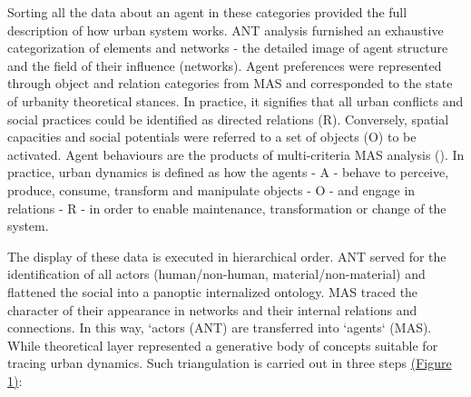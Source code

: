 \documentclass[11pt]{report}
\begin{document}
Sorting all the data about an agent in these categories provided the full description of how urban system works. ANT analysis furnished an exhaustive categorization of elements and networks - the detailed image of agent structure and the field of their influence (networks). Agent preferences were represented through object and relation categories from MAS and corresponded to the state of urbanity theoretical stances. In practice, it signifies that all urban conflicts and social practices could be identified as directed relations (R). Conversely, spatial capacities and social potentials were referred to a set of objects (O) to be activated. Agent behaviours are the products of multi-criteria MAS analysis (\cite{Arsanjani et al. 2013}). In practice, urban dynamics is defined as how the agents - A - behave to perceive, produce, consume, transform and manipulate objects - O - and engage in relations - R - in order to enable maintenance, transformation or change of the system.

The display of these data is executed in hierarchical order. ANT served for the identification of all actors (human/non-human, material/non-material) and flattened the social into a panoptic internalized ontology. MAS traced the character of their appearance in networks and their internal relations and connections. In this way, `actors (ANT) are transferred into `agents` (MAS). While theoretical layer represented a generative body of concepts suitable for tracing urban dynamics. Such triangulation is carried out in three steps \href{ref}{(Figure 1)}:
\end{document}
